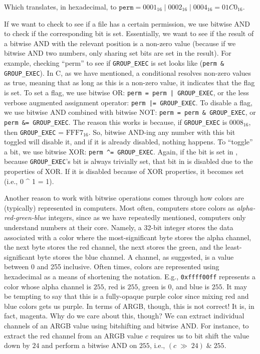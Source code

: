 Which translates, in hexadecimal, to $\texttt{perm} = 0001_{16}\;|\;0002_{16}\;|\;0004_{16} = 01C0_{16}$.

If we want to check to see if a file has a certain permission, we use bitwise AND to check if the corresponding bit is set. Essentially, we want to see if the result of a bitwise AND with the relevant position is a non-zero value (because if we bitwise AND two numbers, only sharing set bits are set in the result). For example, checking ``perm'' to see if \texttt{GROUP\_EXEC} is set looks like (\texttt{perm \& GROUP\_EXEC}). In C, as we have mentioned, a conditional resolves non-zero values as true, meaning that as long as this is a non-zero value, it indicates that the flag is set. To set a flag, we use bitwise OR: \texttt{perm = perm | GROUP\_EXEC}, or the less verbose augmented assignment operator: \texttt{perm |= GROUP\_EXEC}. To disable a flag, we use bitwise AND combined with bitwise NOT: \texttt{perm = perm \& \bt{}GROUP\_EXEC}, or \texttt{perm \&= \bt{}GROUP\_EXEC}. The reason this works is because, if \texttt{GROUP\_EXEC} is $0008_{16}$, then \texttt{\bt{}GROUP\_EXEC} = $\text{FFF}7_{16}$. So, bitwise AND-ing any number with this bit toggled will disable it, and if it is already disabled, nothing happens. To ``toggle'' a bit, we use bitwise XOR: \texttt{perm \^{}= GROUP\_EXEC}. Again, if the bit is set in , because \texttt{GROUP\_EXEC}'s bit is always trivially set, that bit in  is disabled due to the properties of XOR. If it is disabled because of XOR properties, it becomes set (i.e., 0 \^{} 1 = 1).

Another reason to work with bitwise operations comes through how colors are (typically) represented in computers. Most often, computers store colors as \textit{alpha-red-green-blue} integers, since as we have repeatedly mentioned, computers only understand numbers at their core. Namely, a 32-bit integer stores the data associated with a color where the most-significant byte stores the alpha channel, the next byte stores the red channel, the next stores the green, and the least-significant byte stores the blue channel. A channel, as suggested, is a value between 0 and 255 inclusive. Often times, colors are represented using hexadecimal as a means of shortening the notation. E.g., \texttt{0xffff00ff} represents a color whose alpha channel is $255$, red is $255$, green is $0$, and blue is $255$. It may be tempting to say that this is a fully-opaque purple color since mixing red and blue colors gets us purple. In terms of ARGB, though, this is not correct! It is, in fact, magenta. Why do we care about this, though? We can extract individual channels of an ARGB value using bitshifting and bitwise AND. For instance, to extract the red channel from an ARGB value $c$ requires us to bit shift the value down by $24$ and perform a bitwise AND on $255$, i.e., $(c\;\gg\;24)\;\&\;255$.

